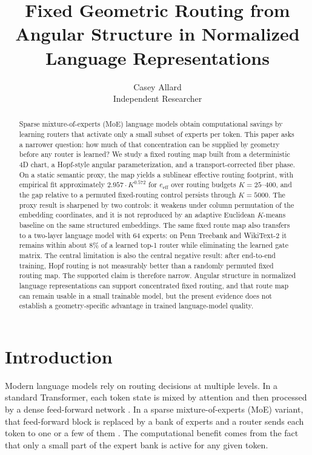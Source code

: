\documentclass[10pt,letterpaper]{article}
\title{\textbf{Fixed Geometric Routing from Angular Structure in Normalized Language Representations}}
\author{Casey Allard\\Independent Researcher}
\date{}
\begin{document}
\maketitle

\begin{abstract}
Sparse mixture-of-experts (MoE) language models obtain computational savings by learning routers that activate only a small subset of experts per token. This paper asks a narrower question: how much of that concentration can be supplied by geometry before any router is learned? We study a fixed routing map built from a deterministic 4D chart, a Hopf-style angular parameterization, and a transport-corrected fiber phase. On a static semantic proxy, the map yields a sublinear effective routing footprint, with empirical fit approximately $2.957 \cdot K^{0.572}$ for $e_{\mathrm{eff}}$ over routing budgets $K=25$--$400$, and the gap relative to a permuted fixed-routing control persists through $K=5000$. The proxy result is sharpened by two controls: it weakens under column permutation of the embedding coordinates, and it is not reproduced by an adaptive Euclidean $K$-means baseline on the same structured embeddings. The same fixed route map also transfers to a two-layer language model with 64 experts: on Penn Treebank and WikiText-2 it remains within about $8\%$ of a learned top-1 router while eliminating the learned gate matrix. The central limitation is also the central negative result: after end-to-end training, Hopf routing is not measurably better than a randomly permuted fixed routing map. The supported claim is therefore narrow. Angular structure in normalized language representations can support concentrated fixed routing, and that route map can remain usable in a small trainable model, but the present evidence does not establish a geometry-specific advantage in trained language-model quality.
\end{abstract}

\section{Introduction}
Modern language models rely on routing decisions at multiple levels. In a standard Transformer, each token state is mixed by attention and then processed by a dense feed-forward network \citep{vaswani2017attention}. In a sparse mixture-of-experts (MoE) variant, that feed-forward block is replaced by a bank of experts and a router sends each token to one or a few of them \citep{shazeer2017outrageously, lepikhin2021gshard, fedus2022switch, lewis2021base}. The computational benefit comes from the fact that only a small part of the expert bank is active for any given token.
\end{document}
